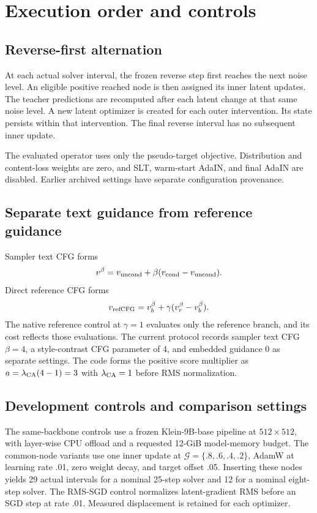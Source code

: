 \section{Execution order and controls}
\subsection{Reverse-first alternation}
At each actual solver interval, the frozen reverse step first reaches the
next noise level. An eligible positive reached node is then assigned its
inner latent updates. The teacher predictions are recomputed after each
latent change at that same noise level. A new latent optimizer is created
for each outer intervention. Its state persists within that intervention.
The final reverse interval has no subsequent inner update.

The evaluated operator uses only the pseudo-target objective. Distribution
and content-loss weights are zero, and SLT, warm-start AdaIN, and final
AdaIN are disabled. Earlier archived settings have separate configuration
provenance.

\subsection{Separate text guidance from reference guidance}
Sampler text CFG forms
\begin{equation}
v^\beta=v_{\rm uncond}+\beta(v_{\rm cond}-v_{\rm uncond}).
\end{equation}
Direct reference CFG forms
\begin{equation}
v_{\rm refCFG}=v_b^\beta+\gamma(v_r^\beta-v_b^\beta).
\end{equation}
The native reference control at $\gamma=1$ evaluates only the reference
branch, and its cost reflects those evaluations. The current protocol records sampler text CFG $\beta=4$, a
style-contrast CFG parameter of 4, and embedded guidance 0 as separate
settings. The code forms the positive score multiplier as
$a=\lambda_{\rm CA}(4-1)=3$ with $\lambda_{\rm CA}=1$ before RMS
normalization.

\subsection{Development controls and comparison settings}
The same-backbone controls use a frozen Klein-9B-base pipeline at
$512\times512$, with layer-wise CPU offload and a requested 12-GiB
model-memory budget. The common-node variants use one inner update at
$\mathcal G=\{.8,.6,.4,.2\}$, AdamW at learning rate .01, zero weight
decay, and target offset .05. Inserting these nodes yields 29 actual
intervals for a nominal 25-step solver and 12 for a nominal eight-step
solver. The RMS-SGD control normalizes latent-gradient RMS before an SGD
step at rate .01. Measured displacement is retained for each optimizer.

